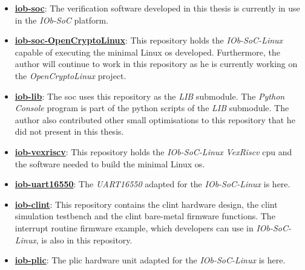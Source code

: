 \begin{itemize}
    \item \href{https://github.com/IObundle/iob-soc}{\textbf{iob-soc}}: The verification software developed in this thesis is currently in use in the \textit{IOb-SoC} platform.
    \item \href{https://github.com/IObundle/iob-soc-opencryptolinux}{\textbf{iob-soc-OpenCryptoLinux}}: This repository holds the \textit{IOb-SoC-Linux} capable of executing the minimal Linux \acrshort{os} developed. Furthermore, the author will continue to work in this repository as he is currently working on the \textit{OpenCryptoLinux} project.
    \item \href{https://github.com/IObundle/iob-lib}{\textbf{iob-lib}}: The \acrshort{soc} uses this repository as the \textit{LIB} submodule. The \textit{Python} \textit{Console} program is part of the python scripts of the \textit{LIB} submodule. The author also contributed other small optimisations to this repository that he did not present in this thesis.
    \item \href{https://github.com/IObundle/iob-vexriscv}{\textbf{iob-vexriscv}}: This repository holds the \textit{IOb-SoC-Linux} \textit{VexRiscv} \acrshort{cpu} and the software needed to build the minimal Linux \acrshort{os}.
    \item \href{https://github.com/IObundle/iob-uart16550}{\textbf{iob-uart16550}}: The \textit{UART16550} adapted for the \textit{IOb-SoC-Linux} is here.
    \item \href{https://github.com/IObundle/iob-clint}{\textbf{iob-clint}}: This repository contains the \acrshort{clint} hardware design, the \acrshort{clint} simulation testbench and the \acrshort{clint} bare-metal firmware functions. The interrupt routine firmware example, which developers can use in \textit{IOb-SoC-Linux}, is also in this repository.
    \item \href{https://github.com/IObundle/iob-plic}{\textbf{iob-plic}}: The \acrshort{plic} hardware unit adapted for the \textit{IOb-SoC-Linux} is here.
\end{itemize}

